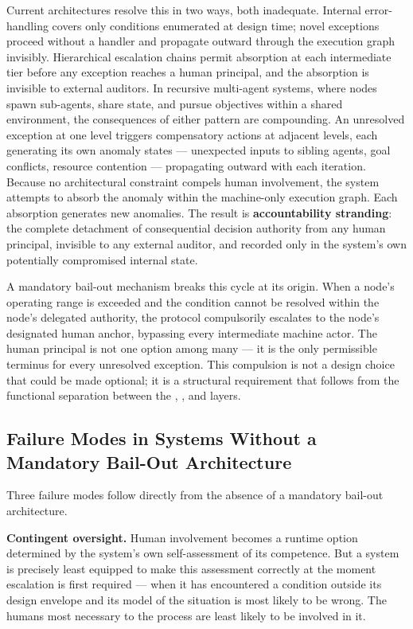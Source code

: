 Current architectures resolve this in two ways, both inadequate. Internal error-handling covers only conditions enumerated at design time; novel exceptions proceed without a handler and propagate outward through the execution graph invisibly. Hierarchical escalation chains permit absorption at each intermediate tier before any exception reaches a human principal, and the absorption is invisible to external auditors. In recursive multi-agent systems, where nodes spawn sub-agents, share state, and pursue objectives within a shared environment, the consequences of either pattern are compounding. An unresolved exception at one level triggers compensatory actions at adjacent levels, each generating its own anomaly states — unexpected inputs to sibling agents, goal conflicts, resource contention — propagating outward with each iteration. Because no architectural constraint compels human involvement, the system attempts to absorb the anomaly within the machine-only execution graph. Each absorption generates new anomalies. The result is \textbf{accountability stranding}: the complete detachment of consequential decision authority from any human principal, invisible to any external auditor, and recorded only in the system's own potentially compromised internal state.

A mandatory bail-out mechanism breaks this cycle at its origin. When a node's operating range is exceeded and the condition cannot be resolved within the node's delegated authority, the protocol compulsorily escalates to the node's designated human anchor, bypassing every intermediate machine actor. The human principal is not one option among many — it is the only permissible terminus for every unresolved exception. This compulsion is not a design choice that could be made optional; it is a structural requirement that follows from the functional separation between the \purpose, \bounds, and \fact layers.

\subsection{Failure Modes in Systems Without a Mandatory Bail-Out Architecture}
\label{sec:failure-modes}

Three failure modes follow directly from the absence of a mandatory bail-out architecture.

\textbf{Contingent oversight.} Human involvement becomes a runtime option determined by the system's own self-assessment of its competence. But a system is precisely least equipped to make this assessment correctly at the moment escalation is first required — when it has encountered a condition outside its design envelope and its model of the situation is most likely to be wrong. The humans most necessary to the process are least likely to be involved in it.

